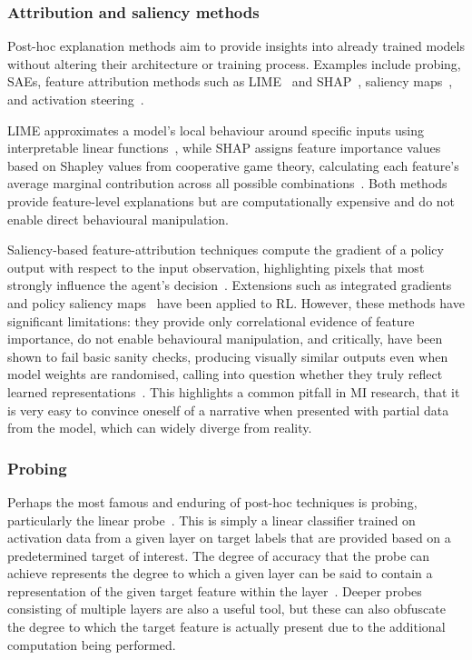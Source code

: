 \subsubsection{Attribution and saliency methods} Post-hoc explanation methods aim to provide insights into already trained models without altering their architecture or training process. Examples include probing, SAEs, feature attribution methods such as LIME~\citep{ribeiro_2016_why} and SHAP~\citep{lundberg_2017_unified}, saliency maps~\citep{Simonyan14a,selvaraju_2017_gradcam}, and activation steering~\citep{turner_2024_steering,zou_2025_representation}.

LIME approximates a model's local behaviour around specific inputs using interpretable linear functions~\citep{ribeiro_2016_why}, while SHAP assigns feature importance values based on Shapley values from cooperative game theory, calculating each feature's average marginal contribution across all possible combinations~\citep{lundberg_2017_unified}. Both methods provide feature-level explanations but are computationally expensive and do not enable direct behavioural manipulation.

Saliency-based feature-attribution techniques compute the gradient of a policy output with respect to the input observation, highlighting pixels that most strongly influence the agent's decision~\citep{greydanus_2018_visualizing}. Extensions such as integrated gradients~\citep{sundararajan_2017_axiomatic} and policy saliency maps~\citep{atrey_2020_exploratory} have been applied to RL. However, these methods have significant limitations: they provide only correlational evidence of feature importance, do not enable behavioural manipulation, and critically, have been shown to fail basic sanity checks, producing visually similar outputs even when model weights are randomised, calling into question whether they truly reflect learned representations~\citep{adebayo_2020_sanity}. This highlights a common pitfall in MI research, that it is very easy to convince oneself of a narrative when presented with partial data from the model, which can widely diverge from reality.

\subsubsection{Probing}\label{subsubsec:probing}
Perhaps the most famous and enduring of post-hoc techniques is probing, particularly the linear probe~\citep{alain_2018_understanding}. This is simply a linear classifier trained on activation data from a given layer on target labels that are provided based on a predetermined target of interest. The degree of accuracy that the probe can achieve represents the degree to which a given layer can be said to contain a representation of the given target feature within the layer~\citep{alain_2018_understanding}. Deeper probes consisting of multiple layers are also a useful tool, but these can also obfuscate the degree to which the target feature is actually present due to the additional computation being performed.


